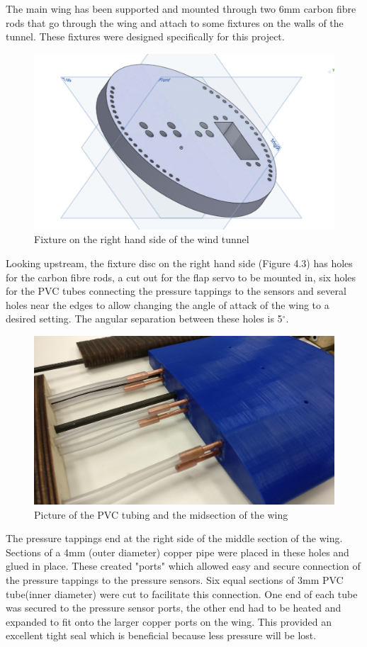 The main wing has been supported and mounted through two 6mm carbon fibre rods that go through the wing and attach to some fixtures on the walls of the tunnel. These fixtures were designed specifically for this project. 
\begin{figure}[H]
\includegraphics[scale=0.45]{fix.png}
\caption{Fixture on the right hand side of the wind tunnel}
\end{figure}
Looking upstream, the fixture disc on the right hand side (Figure 4.3) has holes for the carbon fibre rods, a cut out for the flap servo to be mounted in, six holes for the PVC tubes connecting the pressure tappings to the sensors and several holes near the edges to allow changing the angle of attack of the wing to a desired setting. The angular separation between these holes is 5$^{\circ}$. 
\thispagestyle{fancy}
\begin{figure}[h]
\centering
\includegraphics[scale=0.1]{pipe.jpg}
\caption{Picture of the PVC tubing and the midsection of the wing}
\centering
\end{figure}
The pressure tappings end at the right side of the middle section of the wing. Sections of a 4mm (outer diameter) copper pipe were placed in these holes and glued in place. \thispagestyle{fancy} These created "ports" which allowed easy and secure connection of the pressure tappings to the pressure sensors. Six equal sections of 3mm PVC tube(inner diameter) were cut to facilitate this connection. One end of each tube was secured to the pressure sensor ports, the other end had to be heated and expanded to fit onto the larger copper ports on the wing. This provided an excellent tight seal which is beneficial because less pressure will be lost. 
\thispagestyle{fancy}

